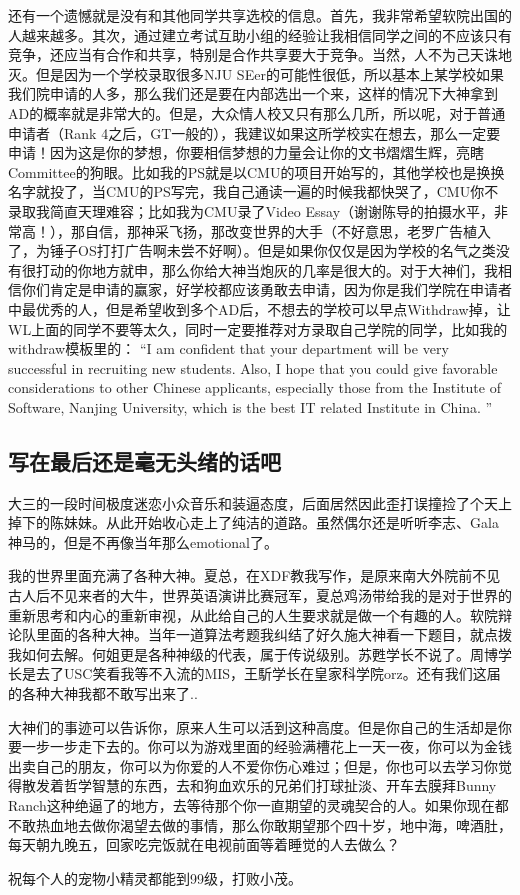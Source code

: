 还有一个遗憾就是没有和其他同学共享选校的信息。首先，我非常希望软院出国的人越来越多。其次，通过建立考试互助小组的经验让我相信同学之间的不应该只有竞争，还应当有合作和共享，特别是合作共享要大于竞争。当然，人不为己天诛地灭。但是因为一个学校录取很多NJU SEer的可能性很低，所以基本上某学校如果我们院申请的人多，那么我们还是要在内部选出一个来，这样的情况下大神拿到AD的概率就是非常大的。但是，大众情人校又只有那么几所，所以呢，对于普通申请者（Rank 4之后，GT一般的），我建议如果这所学校实在想去，那么一定要申请！因为这是你的梦想，你要相信梦想的力量会让你的文书熠熠生辉，亮瞎Committee的狗眼。比如我的PS就是以CMU的项目开始写的，其他学校也是换换名字就投了，当CMU的PS写完，我自己通读一遍的时候我都快哭了，CMU你不录取我简直天理难容；比如我为CMU录了Video Essay（谢谢陈导的拍摄水平，非常高！），那自信，那神采飞扬，那改变世界的大手（不好意思，老罗广告植入了，为锤子OS打打广告啊未尝不好啊）。但是如果你仅仅是因为学校的名气之类没有很打动的你地方就申，那么你给大神当炮灰的几率是很大的。对于大神们，我相信你们肯定是申请的赢家，好学校都应该勇敢去申请，因为你是我们学院在申请者中最优秀的人，但是希望收到多个AD后，不想去的学校可以早点Withdraw掉，让WL上面的同学不要等太久，同时一定要推荐对方录取自己学院的同学，比如我的withdraw模板里的：
“I am confident that your department will be very successful in recruiting new students. Also, I hope that you could give favorable considerations to other Chinese applicants, especially those from the Institute of Software, Nanjing University, which is the best IT related Institute in China. ”

\newpage
\subsection{写在最后还是毫无头绪的话吧}

大三的一段时间极度迷恋小众音乐和装逼态度，后面居然因此歪打误撞捡了个天上掉下的陈妹妹。从此开始收心走上了纯洁的道路。虽然偶尔还是听听李志、Gala神马的，但是不再像当年那么emotional了。\par
我的世界里面充满了各种大神。夏总，在XDF教我写作，是原来南大外院前不见古人后不见来者的大牛，世界英语演讲比赛冠军，夏总鸡汤带给我的是对于世界的重新思考和内心的重新审视，从此给自己的人生要求就是做一个有趣的人。软院辩论队里面的各种大神。当年一道算法考题我纠结了好久施大神看一下题目，就点拨我如何去解。何姐更是各种神级的代表，属于传说级别。苏甦学长不说了。周博学长是去了USC笑看我等不入流的MIS，王馸学长在皇家科学院orz。还有我们这届的各种大神我都不敢写出来了..\par
 大神们的事迹可以告诉你，原来人生可以活到这种高度。但是你自己的生活却是你要一步一步走下去的。你可以为游戏里面的经验满槽花上一天一夜，你可以为金钱出卖自己的朋友，你可以为你爱的人不爱你伤心难过；但是，你也可以去学习你觉得散发着哲学智慧的东西，去和狗血欢乐的兄弟们打球扯淡、开车去膜拜Bunny Ranch这种绝逼了的地方，去等待那个你一直期望的灵魂契合的人。如果你现在都不敢热血地去做你渴望去做的事情，那么你敢期望那个四十岁，地中海，啤酒肚，每天朝九晚五，回家吃完饭就在电视前面等着睡觉的人去做么？\par
祝每个人的宠物小精灵都能到99级，打败小茂。\par
